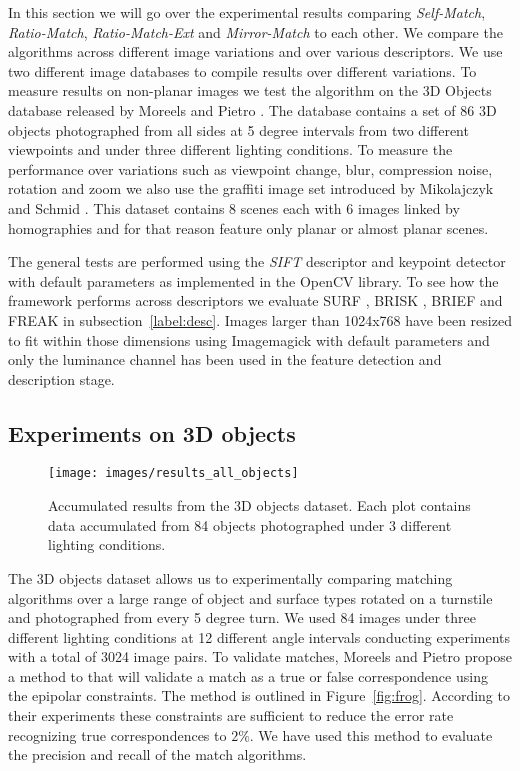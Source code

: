 \documentclass[journal]{IEEEtran}
\begin{document}
In this section we will go over the experimental results comparing 
\emph{Self-Match}, \emph{Ratio-Match}, \emph{Ratio-Match-Ext} and 
\emph{Mirror-Match} to each other. We compare the algorithms across 
different image variations and over various descriptors. We use two 
different image databases to compile results over different variations.  
To measure results on non-planar images we test the algorithm on the 3D 
Objects database released by Moreels and Pietro 
\cite{moreels2007evaluation}. The database contains a set of 86 3D 
objects photographed from all sides at 5 degree intervals from two 
different viewpoints and under three different lighting conditions.
To measure the performance over variations such as viewpoint change, 
blur, compression noise, rotation and zoom we also use the graffiti 
image set introduced by Mikolajczyk and Schmid 
\cite{mikolajczyk2005performance}.  This dataset contains 8 scenes each 
with 6 images linked by homographies and for that reason feature only 
planar or almost planar scenes.

The general tests are performed using the \emph{SIFT} descriptor and 
keypoint detector with default parameters as implemented in the OpenCV 
library. To see how the framework performs across descriptors we 
evaluate SURF \cite{bay2006surf}, BRISK \cite{leutenegger2011brisk}, 
BRIEF \cite{calonder2010brief} and FREAK \cite{alahi2012freak} in 
subsection~\ref{label:desc}. Images larger than 1024x768 have been
resized to fit within those dimensions using Imagemagick with default 
parameters and only the luminance channel has been used in the feature 
detection and description stage.

\subsection{Experiments on 3D objects}

\begin{figure*}[ht]
	\centering
    \texttt{[image: images/results\_all\_objects]}
    \caption{Accumulated results from the 3D objects dataset. Each plot 
    contains data accumulated from 84 objects photographed under 3 
different lighting conditions.}
    \label{fig:all_objects}
\end{figure*}


The 3D objects dataset allows us to experimentally comparing matching 
algorithms over a large range of object and surface types rotated on a 
turnstile and photographed from every 5 degree turn. We used 84 images 
under three different lighting conditions at 12 different angle 
intervals conducting experiments with a total of 3024 image pairs. To 
validate matches, Moreels and Pietro propose a method to that will 
validate a match as a true or false correspondence \cite[p.  
266]{moreels2007evaluation} using the epipolar constraints.  The method 
is outlined in Figure~\ref{fig:frog}.  According to their experiments 
these constraints are sufficient to reduce the error rate recognizing 
true correspondences to $2\%$. We have used this method
to evaluate the precision and recall of the match algorithms.
\end{document}
